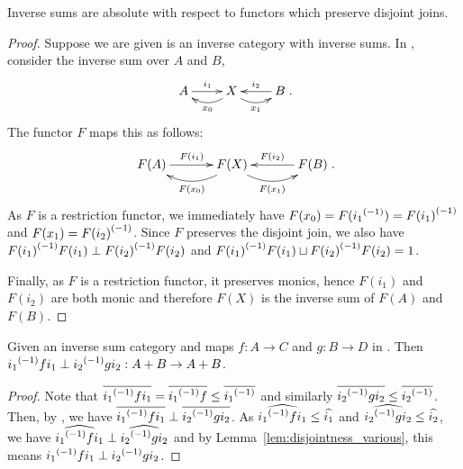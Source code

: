 \begin{lemma}\label{lem:functor_preserving_joins_preserves_inverse_sums}
  Inverse sums are absolute with respect to functors which preserve disjoint joins.
\end{lemma}
\begin{proof}
  Suppose we are given \X is an inverse category with inverse sums.
  In \X, consider the inverse sum over $A$ and $B$,
  \[
    \xymatrix{
      A\ar[r]^{i_1} &X\ar@/^9pt/[l]^{x_0} \ar@/_9pt/[r]_{x_1} & B \ar[l]_{i_2}
    }.
  \]
  The functor $F$ maps this as follows:
  \[
    \xymatrix@R+10pt@C+10pt{
      F(A)\ar[r]^{F(i_1)} &F(X)\ar@/^13pt/[l]^{F(x_0)} \ar@/_13pt/[r]_{F(x_1)} & F(B)\ar[l]_{F(i_2)}
    }.
  \]
  As $F$ is a restriction functor, we immediately have $F(x_0) = F({i_1}^{(-1)}) = {F(i_1)}^{(-1)}$ and
  $F(x_1) = {F(i_2)}^{(-1)}$. Since $F$ preserves the disjoint join, we also have
  ${F(i_1)}^{(-1)}F(i_1) \perp{F(i_2)}^{(-1)}F(i_2)$ and
  ${F(i_1)}^{(-1)}F(i_1) \sqcup {F(i_2)}^{(-1)}F(i_2) = 1$.

  Finally, as $F$ is a restriction functor, it preserves monics, hence $F(i_1)$ and $F(i_2)$ are
  both monic and therefore $F(X)$ is the inverse sum of $F(A)$ and $F(B)$.

\end{proof}
\begin{lemma}\label{lem:inverse_sum_maps_are_perp}
  Given \X an inverse sum category and maps $f:A \to C$ and $g:B\to D$ in \X. Then
  ${i_1}^{(-1)} f i_1 \perp {i_2}^{(-1)} g i_2 : {{A}+{B}}\to {{A}+{B}}$.
\end{lemma}
\begin{proof}
  Note that $\overline{{i_1}^{(-1)} f i_1} = \overline{{i_1}^{(-1)} f} \le \overline{{i_1}^{(-1)}}$ and similarly
  $\overline{{i_2}^{(-1)} g i_2} \le \overline{{i_2}^{(-1)}}$. Then, by , we have
  $\overline{{i_1}^{(-1)} f i_1} \perp \overline{{i_2}^{(-1)} g i_2}$.
  As $\widehat{{i_1}^{(-1)} f i_1} \le \widehat{i_1}$ and  $\widehat{{i_2}^{(-1)} g i_2} \le \widehat{i_2}$, we
  have $\widehat{{i_1}^{(-1)} f i_1} \perp \widehat{{i_2}^{(-1)} g i_2}$ and by
  Lemma~\ref{lem:disjointness_various}, this means  ${i_1}^{(-1)} f i_1\perp {i_2}^{(-1)} g i_2$.
\end{proof}


